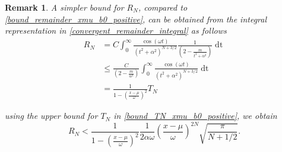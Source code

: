 \documentclass[10pt,a4paper,oneside]{article}
\newtheorem{remark}[theorem]{Remark}
\numberwithin{equation}{section}
\begin{document}
\begin{table}[H]
	\centering
	\caption{Absolute error and bound \eqref{bound_remainder_xmu_b0_positive} estimating $N$ using \eqref{N_expansion_xmu_b0_positive} for the series expansion  \eqref{expansion_xmu_b0_positive} with machine-precision absolute error.}
	\label{table_bound_remainder_xmu_b0_positive_large_N}
\end{table}

\begin{remark}
A simpler bound for $R_N$, compared to \eqref{bound_remainder_xmu_b0_positive}, can be obtained from the integral representation in \eqref{convergent_remainder_integral} as follows
\begin{align*}
R_N &= C \int_0^{\infty} \frac{\cos(\omega t)}{(t^2 + \alpha^2)^{N + 3/2}} \frac{1}{\left(2 - \frac{m}{t^2+ \alpha^2}\right)} \mathop{dt}\\
&\le \frac{C}{\left(2 - \frac{m}{\alpha^2}\right)} \int_0^{\infty} \frac{\cos(\omega t)}{(t^2 + \alpha^2)^{N + 3/2}} \mathop{dt}\\
&= \frac{1}{1 - \left(\frac{x-\mu}{\omega}\right)^2} T_N
\end{align*}

using the upper bound for $T_N$ in \eqref{bound_TN_xmu_b0_positive}, we obtain
\begin{equation}
R_N < \frac{1}{1 - \left(\frac{x-\mu}{\omega}\right)^2} \frac{1}{2\alpha\omega}\left(\frac{x-\mu}{\omega}\right)^{2N} \sqrt{\frac{\pi}{N + 1/2}}.
\end{equation}
\end{remark}
\end{document}
